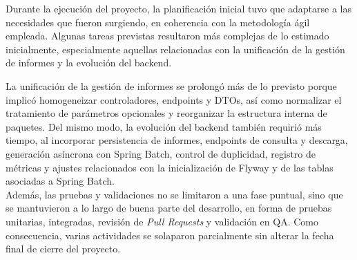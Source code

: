 \documentclass[11pt,a4paper,titlepage,oneside]{report}
\begin{document}
Durante la ejecución del proyecto, la planificación inicial tuvo que adaptarse a las necesidades que fueron surgiendo, en coherencia con la metodología ágil empleada. Algunas tareas previstas resultaron más complejas de lo estimado inicialmente, especialmente aquellas relacionadas con la unificación de la gestión de informes y la evolución del backend.

La unificación de la gestión de informes se prolongó más de lo previsto porque implicó homogeneizar controladores, endpoints y DTOs, así como normalizar el tratamiento de parámetros opcionales y reorganizar la estructura interna de paquetes. Del mismo modo, la evolución del backend también requirió más tiempo, al incorporar persistencia de informes, endpoints de consulta y descarga, generación asíncrona con Spring Batch, control de duplicidad, registro de métricas y ajustes relacionados con la inicialización de Flyway y de las tablas asociadas a Spring Batch. \\

Además, las pruebas y validaciones no se limitaron a una fase puntual, sino que se mantuvieron a lo largo de buena parte del desarrollo, en forma de pruebas unitarias, integradas, revisión de \textit{Pull Requests} y validación en QA. Como consecuencia, varias actividades se solaparon parcialmente sin alterar la fecha final de cierre del proyecto.
\end{document}
